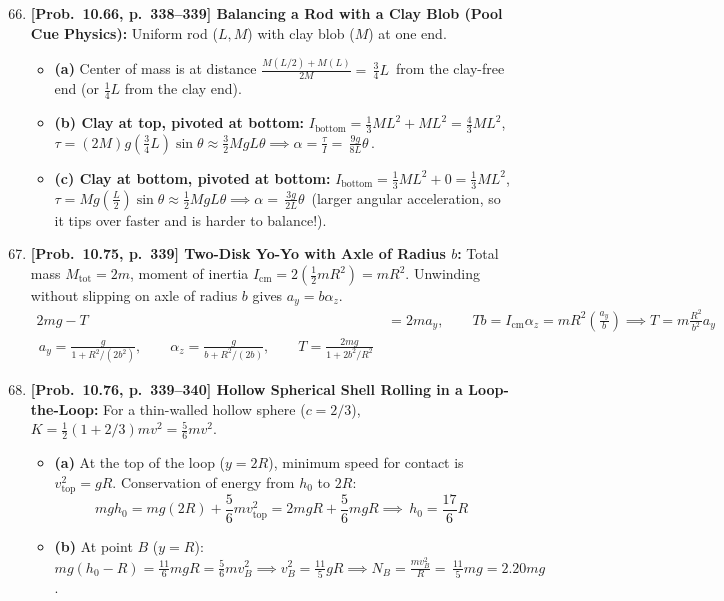 \documentclass[11pt,a4paper,openany,oneside]{book}
\newcommand{\eqbox}[1]{\boxed{\,#1\,}}
\numberwithin{equation}{chapter}
\begin{document}
\begin{enumerate}[label=\textbf{Prob.\ 10.\arabic*},leftmargin=4.5em]
  \setcounter{enumi}{65}
  \item \textbf{[Prob.\ 10.66, p.\ 338--339] Balancing a Rod with a Clay Blob (Pool Cue Physics):}
  Uniform rod ($L, M$) with clay blob ($M$) at one end.
  \begin{itemize}
    \item \textbf{(a)} Center of mass is at distance $\frac{M(L/2) + M(L)}{2M} = \eqbox{\frac{3}{4}L}$ from the clay-free end (or $\frac{1}{4}L$ from the clay end).
    \item \textbf{(b) Clay at top, pivoted at bottom:} $I_{\text{bottom}} = \frac{1}{3}ML^2 + ML^2 = \frac{4}{3}ML^2$, $\tau = (2M)g\!\left(\frac{3}{4}L\right)\sin\theta \approx \frac{3}{2}MgL\theta \implies \alpha = \frac{\tau}{I} = \eqbox{\frac{9g}{8L}\theta}$.
    \item \textbf{(c) Clay at bottom, pivoted at bottom:} $I_{\text{bottom}} = \frac{1}{3}ML^2 + 0 = \frac{1}{3}ML^2$, $\tau = Mg\!\left(\frac{L}{2}\right)\sin\theta \approx \frac{1}{2}MgL\theta \implies \alpha = \eqbox{\frac{3g}{2L}\theta}$ (larger angular acceleration, so it tips over faster and is harder to balance!).
  \end{itemize}

  \setcounter{enumi}{74}
  \item \textbf{[Prob.\ 10.75, p.\ 339] Two-Disk Yo-Yo with Axle of Radius $b$:}
  Total mass $M_{\text{tot}} = 2m$, moment of inertia $I_{\text{cm}} = 2\!\left(\frac{1}{2}mR^2\right) = mR^2$. Unwinding without slipping on axle of radius $b$ gives $a_y = b\alpha_z$.
  \begin{align*}
    2mg - T &= 2ma_y, \qquad Tb = I_{\text{cm}}\alpha_z = mR^2\!\left(\frac{a_y}{b}\right) \implies T = m\frac{R^2}{b^2}a_y\\
    \eqbox{a_y = \frac{g}{1 + R^2/(2b^2)}, \qquad \alpha_z = \frac{g}{b + R^2/(2b)}, \qquad T = \frac{2mg}{1 + 2b^2/R^2}}
  \end{align*}

  \item \textbf{[Prob.\ 10.76, p.\ 339--340] Hollow Spherical Shell Rolling in a Loop-the-Loop:}
  For a thin-walled hollow sphere ($c = 2/3$), $K = \frac{1}{2}(1+2/3)mv^2 = \frac{5}{6}mv^2$.
  \begin{itemize}
    \item \textbf{(a)} At the top of the loop ($y = 2R$), minimum speed for contact is $v_{\text{top}}^2 = gR$. Conservation of energy from $h_0$ to $2R$:
    \begin{equation*}
      mgh_0 = mg(2R) + \frac{5}{6}mv_{\text{top}}^2 = 2mgR + \frac{5}{6}mgR \implies \eqbox{h_0 = \frac{17}{6}R}
    \end{equation*}
    \item \textbf{(b)} At point $B$ ($y = R$): $mg(h_0 - R) = \frac{11}{6}mgR = \frac{5}{6}mv_B^2 \implies v_B^2 = \frac{11}{5}gR \implies N_B = \frac{mv_B^2}{R} = \eqbox{\frac{11}{5}mg = 2.20mg}$.
  \end{itemize}


\end{enumerate}
\end{document}

